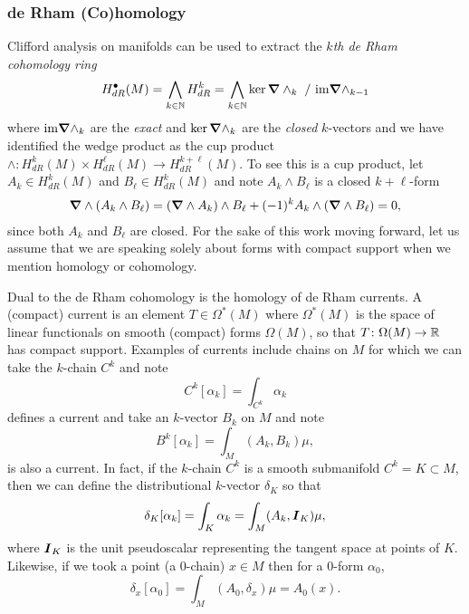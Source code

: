 \documentclass[conf]{new-aiaa}
\begin{document}
\subsubsection{de Rham (Co)homology}

\label{subsubsec:derham}

Clifford analysis on manifolds can be used to extract the \emph{$k$th de Rham cohomology ring}
\begin{equation}
H^\bullet_{dR}(M) = \bigwedge_{k \in \mathbb{N}} H^k_{dR} = \bigwedge_{k \in \mathbb{N}} \ker \boldsymbol{\nabla} \wedge_k ~/~ \mathrm{im} \boldsymbol{\nabla} \wedge_{k-1}
\end{equation}
where $\mathrm{im} \boldsymbol{\nabla} \wedge_k$ are the \emph{exact} and $\ker \boldsymbol{\nabla} \wedge_k$ are the \emph{closed} $k$-vectors and we have identified the wedge product as the cup product $\wedge \colon H^k_{dR}(M) \times H^\ell_{dR}(M) \to H^{k+\ell}_{dR}(M)$. To see this is a cup product, let $A_k \in H^k_{dR}(M)$ and $B_\ell \in H^k_{dR}(M)$ and note $A_k \wedge B_\ell$ is a closed $k+\ell$-form
\begin{align}
\boldsymbol{\nabla} \wedge (A_k \wedge B_\ell) = (\boldsymbol{\nabla} \wedge A_k) \wedge B_\ell + (-1)^k A_k \wedge (\boldsymbol{\nabla} \wedge B_\ell) = 0,
\end{align}
since both $A_k$ and $B_\ell$ are closed. For the sake of this work moving forward, let us assume that we are speaking solely about forms with compact support when we mention homology or cohomology.

Dual to the de Rham cohomology is the homology of de Rham currents. A (compact) current is an element $T\in \Omega^*(M)$ where $\Omega^*(M)$ is the space of linear functionals on smooth (compact) forms $\Omega(M)$, so that $T\colon \Omega(M)\to \mathbb{R}$ has compact support. Examples of currents include chains on $M$ for which we can take the $k$-chain $C^k$ and note
\begin{equation}
    C^k[\alpha_k] = \int_{C^k} \alpha_k
\end{equation}
defines a current and take an $k$-vector $B_{k}$ on $M$ and note
\begin{equation}
    B^{k}[\alpha_k] = \int_M (A_k,B_k) \mu,
\end{equation}
is also a current. In fact, if the $k$-chain $C^k$ is a smooth submanifold $C^k=K\subset M$, then we can define the distributional $k$-vector $\delta_K$ so that
\begin{equation}
\delta_K[\alpha_k] = \int_{K} \alpha_k = \int_{M} (A_k, \boldsymbol{I}_K)\mu,
\end{equation}
where $\boldsymbol{I}_K$ is the unit pseudoscalar representing the tangent space at points of $K$. Likewise, if we took a point (a $0$-chain) $x\in M$ then for a $0$-form $\alpha_0$,
\begin{equation}
\delta_x[\alpha_0] = \int_M (A_0,\delta_x) \mu = A_0(x).
\end{equation}
\end{document}
